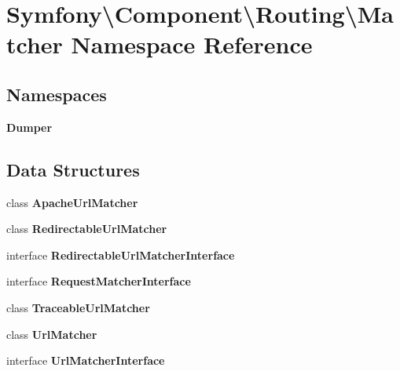 \section{Symfony\textbackslash{}Component\textbackslash{}Routing\textbackslash{}Matcher Namespace Reference}
\label{namespace_symfony_1_1_component_1_1_routing_1_1_matcher}
\subsection*{Namespaces}
\begin{DoxyCompactItemize}
\item 
 {\bf Dumper}
\end{DoxyCompactItemize}
\subsection*{Data Structures}
\begin{DoxyCompactItemize}
\item 
class {\bf Apache\+Url\+Matcher}
\item 
class {\bf Redirectable\+Url\+Matcher}
\item 
interface {\bf Redirectable\+Url\+Matcher\+Interface}
\item 
interface {\bf Request\+Matcher\+Interface}
\item 
class {\bf Traceable\+Url\+Matcher}
\item 
class {\bf Url\+Matcher}
\item 
interface {\bf Url\+Matcher\+Interface}
\end{DoxyCompactItemize}
